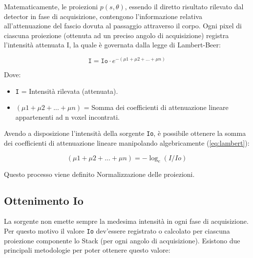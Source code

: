 \documentclass[a4paper,12pt, doubleside]{report}
\begin{document}
                Matematicamente, le proiezioni $p(s,\theta)$, essendo il diretto risultato rilevato dal detector in fase di acquisizione, contengono l'informazione relativa all'attenuazione del fascio dovuta al passaggio attraverso il corpo. Ogni pixel di ciascuna proiezione (ottenuta ad un preciso angolo di acquisizione) registra l'intensità attenuata I, la quale è governata dalla legge di Lambert-Beer\cite{lambert-beer}:

                    \begin{equation} \label{eq:lambert}
                        \texttt{I} = \texttt{Io} \cdot e^{- (\mu1 + \mu2 + ...  + \mu n)}
                    \end{equation}
                    
                    Dove:
                    \begin{itemize}
                      \item \texttt{I} = Intensità rilevata (attenuata).
                      \item \texttt{$ (\mu1 + \mu2 + ... + \mu n) $} = Somma dei coefficienti di attenuazione lineare appartenenti ad n voxel incontrati.
                    \end{itemize}
                    
                \par
                    Avendo a disposizione l'intensità della sorgente \texttt{Io}, è possibile ottenere la somma dei coefficienti di attenuazione lineare manipolando algebricamente (\ref{eq:lambert}):
                    
                    \begin{equation} \label{eq:normalization}
                        (\mu1 + \mu2 + ... + \mu n) = - \log_e{(I/Io)}
                    \end{equation}
                    
                    Questo processo viene definito Normalizzazione delle proiezioni.
                
            \subsection{Ottenimento Io}
                \label{sub:io}
                \par
                    La sorgente non emette sempre la medesima intensità in ogni fase di acquisizione. Per questo motivo il valore \texttt{Io} dev'essere registrato o calcolato per ciascuna proiezione componente lo Stack (per ogni angolo di acquisizione).
                    Esistono due principali metodologie per poter ottenere questo valore:
               
\end{document}
